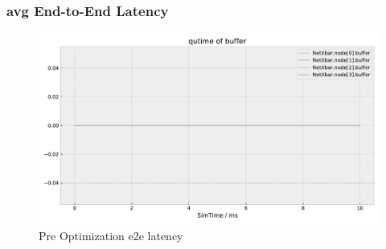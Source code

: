 \documentclass[]{scrartcl}
\begin{document}
    \subsubsection{avg End-to-End Latency}
    \begin{figure}[H]
        \centering
        \includegraphics[width=\columnwidth, page=8]{../../python/results/preopt-General-0}
        \caption{Pre Optimization e2e latency}%
        \label{fig:preopt-2e2}
    \end{figure}
\end{document}
